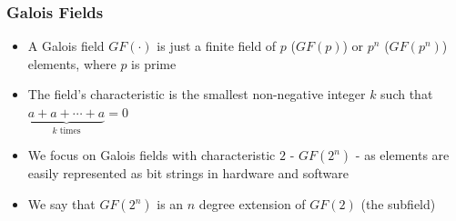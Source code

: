\documentclass[10pt]{beamer}
\begin{document}





\begin{frame}
	\frametitle{Galois Fields}
	\begin{itemize}
		\item A Galois field $GF(\cdot)$ is just a finite field of $p$ ($GF(p)$) or $p^n$ ($GF(p^n)$) elements, where $p$ is prime
		\item The field's characteristic is the smallest non-negative integer $k$ such that $\underbrace{a + a + \dotsb + a}_{k \text{ times}} = 0$
		\item We focus on Galois fields with characteristic $2$ - $GF(2^n)$ - as elements are easily represented as bit strings in hardware and software
		\item We say that $GF(2^n)$ is an $n$ degree extension of $GF(2)$ (the subfield)
	\end{itemize}
\end{frame}
\end{document}

